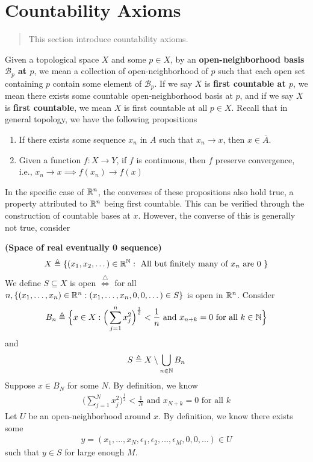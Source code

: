 \documentclass{report}
\begin{document}
\section{Countability Axioms}
\begin{abstract}
This section introduce countability axioms. 
\end{abstract}
\begin{mdframed}
Given a topological space $X$ and some  $p\in  X$, by an \textbf{open-neighborhood basis $\mathcal{B}_p$ at $p$}, we mean a collection of open-neighborhood of $p$ such that each open set containing  $p$ contain some element of  $\mathcal{B}_p$. If we say $X$ is \textbf{first countable at $p$}, we mean there exists some countable open-neighborhood basis at $p$, and if we say  $X$ is  \textbf{first countable}, we mean $X$ is first countable at all $p \in X$. Recall that in general topology, we have the following propositions
\begin{enumerate}[label=(\alph*)]
  \item If there exists some sequence $x_n$ in  $A$ such that $x_n \to x$, then $x \in \overline{A}$. 
  \item Given a function $f:X\rightarrow Y$, if $f$ is continuous,  then $f$ preserve convergence, i.e.,  $x_n \to x \implies f(x_n)\to f(x)$
\end{enumerate}
In the specific case of $\mathbb{R}^n$, the converses of these propositions also hold true, a property attributed to $\mathbb{R}^n$ being first countable. This can be verified through the construction of countable bases at $x$. However, the converse of this is generally not true, consider 
\end{mdframed}
\begin{Example}{\textbf{(Space of real eventually 0  sequence)}}{}
\begin{align*}
X\triangleq \{ (x_1,x_2,\dots )\in\mathbb{R}^{\mathbb{N}}:\text{ All but finitely many of $x_n$ are $0$ } \}
\end{align*}
We define $S\subseteq X$ is open $\overset{\triangle}{\iff }$ for all $n,\{ (x_1,\dots ,x_n)\in\mathbb{R}^n: (x_1,\dots ,x_n,0,0,\dots )\in S \}$ is open in $\mathbb{R}^n$. Consider
\begin{align*}
B_n \triangleq \Big\{ x \in X: \Big( \sum_{j=1}^n x_j^2 \Big)^{\frac{1}{2}}< \frac{1}{n}\text{ and }x_{n+k}=0\text{ for all }k\in\mathbb{N} \Big\}
\end{align*}
and 
\begin{align*}
S\triangleq X \setminus \bigcup_{n\in\mathbb{N}}B_n
\end{align*}
Suppose $x \in B_N$ for some $N$. By definition, we know 
 \begin{align*}
   \Big(\sum_{j=1}^N x_j^2 \Big)^{\frac{1}{2}}<\frac{1}{N}\text{ and }x_{N+k}=0\text{ for all }k 
\end{align*}
Let $U$ be an open-neighborhood around $x$. By definition, we know there exists some 
 \begin{align*}
y=(x_1,\dots ,x_N,\epsilon_1,\epsilon_2,\dots ,\epsilon_M,0,0,\dots )\in U 
\end{align*}
such that $y\in S$ for large enough  $M$.  


\end{Example}
\end{document}

